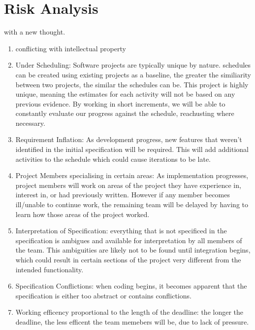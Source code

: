 \chapter[Risk Analysis]{Risk Analysis}
\label{ch:risk}


 with a new thought.

\begin{enumerate}
\item
conflicting with intellectual property

\item
Under Scheduling:
Software projects are typically unique by nature.
schedules can be created using existing projects as a baseline, the greater the similiarity between two projects, the similar the schedules can be.
This project is highly unique, meaning the estimates for each activity will not be based on any previous evidence.
By working in short increments, we will be able to constantly evaluate our progress against the schedule, reachusting where necessary.

\item
Requirement Inflation:
As development progress, new features that weren't identified in the initial specification will be required.
This will add additional activities to the schedule which could cause iterations to be late.

\item
Project Members specialising in certain areas:
As implementation progresses, project members will work on areas of the project they have experience in, interest in, or had previously written.
However if any member becomes ill/unable to continue work, the remaining team will be delayed by having to learn how those areas of the project worked.

\item
Interpretation of Specification:
everything that is not specificed in the specification is ambigues and available for interpretation by all members of the team.
This ambiguities are likely not to be found until integration begins, which could result in certain sections of the project very different from the intended functionality.

\item
Specification Conflictions:
when coding begins, it becomes apparent that the specification is either too abstract or contains conflictions.

\item
Working efficency proportional to the length of the deadline:
the longer the deadline, the less efficent the team memebers will be, due to lack of pressure.

\end{enumerate}
